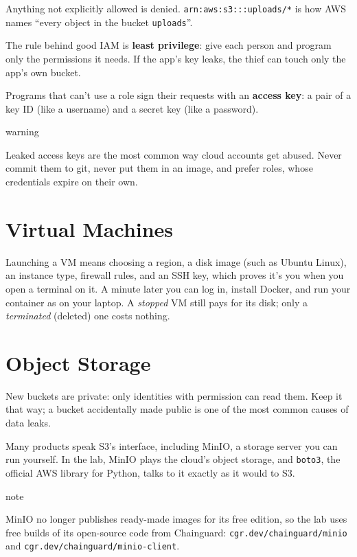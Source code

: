 Anything not explicitly allowed is denied. \texttt{arn:aws:s3:::uploads/}\allowbreak{}\texttt{*} is how AWS names ``every object in the bucket \texttt{uploads}''.

The rule behind good IAM is \textbf{least privilege}: give each person and program only the permissions it needs. If the app's key leaks, the thief can touch only the app's own bucket.

Programs that can't use a role sign their requests with an \textbf{access key}: a pair of a key ID (like a username) and a secret key (like a password).

\begin{callout}{warning}

Leaked access keys are the most common way cloud accounts get abused. Never commit them to git, never put them in an image, and prefer roles, whose credentials expire on their own.

\end{callout}

\section{Virtual Machines}\label{07-cloud-building-blocks:virtual-machines}

Launching a VM means choosing a region, a disk image (such as Ubuntu Linux), an instance type, firewall rules, and an SSH key, which proves it's you when you open a terminal on it. A minute later you can log in, install Docker, and run your container as on your laptop. A \emph{stopped} VM still pays for its disk; only a \emph{terminated} (deleted) one costs nothing.

\section{Object Storage}\label{07-cloud-building-blocks:object-storage}

New buckets are private: only identities with permission can read them. Keep it that way; a bucket accidentally made public is one of the most common causes of data leaks.

Many products speak S3's interface, including MinIO, a storage server you can run yourself. In the lab, MinIO plays the cloud's object storage, and \texttt{boto3}, the official AWS library for Python, talks to it exactly as it would to S3.

\begin{callout}{note}

MinIO no longer publishes ready-made images for its free edition, so the lab uses free builds of its open-source code from Chainguard: \texttt{cgr.}\allowbreak{}\texttt{dev/}\allowbreak{}\texttt{chainguard/}\allowbreak{}\texttt{minio} and \texttt{cgr.}\allowbreak{}\texttt{dev/}\allowbreak{}\texttt{chainguard/}\allowbreak{}\texttt{minio-}\allowbreak{}\texttt{client}.

\end{callout}

